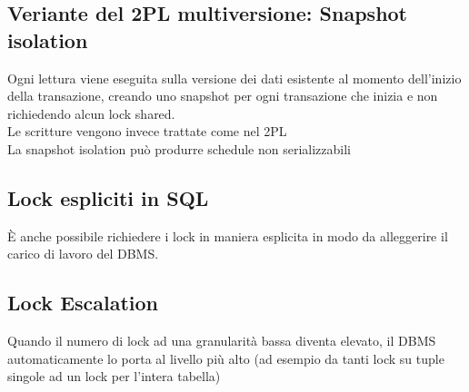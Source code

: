 \subsection{Veriante del 2PL multiversione: Snapshot isolation}
Ogni lettura viene eseguita sulla versione dei dati esistente al momento dell'inizio della transazione, creando uno snapshot per ogni transazione che inizia e non richiedendo alcun lock shared.\\
Le scritture vengono invece trattate come nel 2PL\\
La snapshot isolation può produrre schedule non serializzabili

\subsection{Lock espliciti in SQL}
\`E anche possibile richiedere i lock in maniera esplicita in modo da alleggerire il carico di lavoro del DBMS.

\subsection{Lock Escalation}
Quando il numero di lock ad una granularità bassa diventa elevato, il DBMS automaticamente lo porta al livello più alto (ad esempio da tanti lock su tuple singole ad un lock per l'intera tabella)